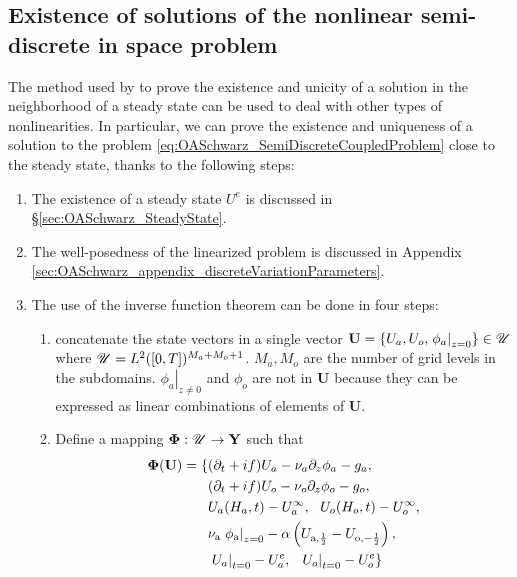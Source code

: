 \subsection{Existence of solutions of the
nonlinear semi-discrete in space problem}
\label{sec:OASchwarz_wellPosedness}
The method used by \citep{chacon-rebollo_existence_2014} to prove
the existence and unicity of a solution in the neighborhood of
a steady state can be used to deal with other types of
nonlinearities. In particular, we can prove the existence and
uniqueness of a solution to the problem
\eqref{eq:OASchwarz_SemiDiscreteCoupledProblem} close to the steady
state, thanks to the following steps:
\begin{enumerate}
	\item The existence of a steady state $U^e$ is discussed in
		\S \ref{sec:OASchwarz_SteadyState}.
	\item The well-posedness of the linearized
		problem is discussed in Appendix
	\ref{sec:OASchwarz_appendix_discreteVariationParameters}.
	\item The use of the inverse function theorem can be
		done in four steps:
	\begin{enumerate}
		\item concatenate the state vectors
			in a single vector $\mathbf{U}=
			\{U_a, U_o, \left.\phi_a\right|_{z=0}\}
			\in \mathbf{\cal U}$
		where $\mathbf{\cal U} = L^2([0,T])^{M_a+M_o+1}$.
		$M_a, M_o$ are the number of grid levels in the
		subdomains.
		$\left.\phi_a\right|_{z\neq 0}$
		and $\phi_o$ are not in $\mathbf{U}$ because they
		can be expressed as linear combinations of elements
			of $\mathbf{U}$.
		\item
	Define a mapping
	$\mathbf{\Phi}: \mathbf{\cal U}\rightarrow \mathbf{Y}$
	such that
\begin{equation}
	\label{eq:OASchwarz_wellPosedness_Phi}
\begin{aligned}
	\mathbf{\Phi}(\mathbf{U}) =
	\{&(\partial_t + if) U_a - \nu_a\partial_z \phi_a - g_a, \\
	&(\partial_t + if) U_o - \nu_o\partial_z \phi_o - g_o, \\
	&U_a(H_a, t) - U^\infty_a, ~~ U_o(H_o, t) - U^\infty_o, \\
	&\nu_{\rm a}\left.\phi_{\rm a}\right|_{z=0} - \alpha
	\left( U_{{\rm a}, \frac{1}{2}} -
	U_{{\rm o}, -\frac{1}{2}}\right), \\
	&\left.U_a\right|_{t=0} - U^e_{a}, ~~
	\left.U_o\right|_{t=0} - U^e_{o}\}
\end{aligned}
\end{equation}

\end{enumerate}
\end{enumerate}
